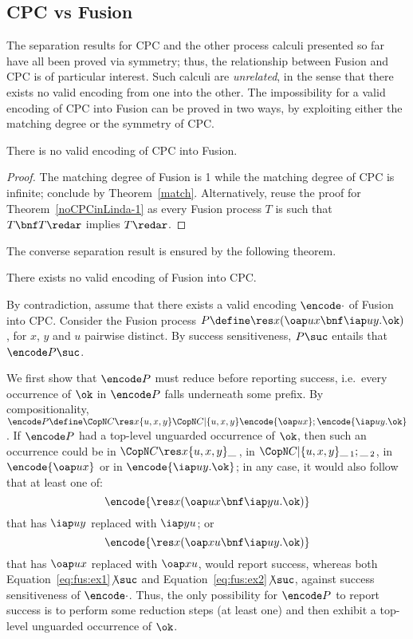 \documentclass{LMCS}
\begin{document}
\subsection{CPC vs Fusion}

The separation results for CPC and the other process calculi presented so far have all been proved via symmetry;
thus, the relationship between Fusion and CPC is of particular interest.
Such calculi are {\em unrelated}, in the sense that there exists no valid
encoding from one into the other. The impossibility for a valid
encoding of CPC into Fusion can be proved in two ways, by exploiting either the matching degree or the symmetry of CPC.

\begin{thm}
\label{thm:nocpc2fusion-1}
There is no valid encoding of CPC into Fusion.
\end{thm}
\begin{proof}
The matching degree of Fusion is 1 while the matching degree of CPC is infinite;
conclude by Theorem~\ref{match}.
Alternatively, reuse the proof for Theorem~\ref{noCPCinLinda-1} as every Fusion process 
$T$ is such that $T\bnf T\redar$ implies $T\redar$.
\end{proof}

The converse separation result is ensured by the following theorem.

\begin{thm}
\label{thm:fusionNoinCPC}
There exists no valid encoding of Fusion into CPC.
\end{thm}
\proof
By contradiction, assume that there exists a valid encoding $\encode\cdot$
of Fusion into CPC.
Consider the Fusion process $P \define \res x(\oap u x\bnf \iap u y.\ok)$,
for $x$, $y$ and $u$ pairwise distinct. By success sensitiveness, $P \suc$
entails that $\encode P \suc$. 

We first show that $\encode P$ must reduce before reporting success,
i.e.\ every occurrence of $\ok$ in $\encode P$ falls underneath
some prefix.  By compositionality, $\encode P \define \CopN C {\res x}
{\{u,x,y\}} {\CopN C | {\{u,x,y\}} {\encode{\oap u x};\\ \encode{\iap u
      y.\ok}}}$.  If $\encode P$ had a top-level unguarded occurrence
of $\ok$, then such an occurrence could be in $\CopN C {\res x}
{\{u,x,y\}} {\_\,}$, in $\CopN C | {\{u,x,y\}} {\_\,_1;\_\,_2}$, in
$\encode{\oap u x}$ or in $\encode{\iap u y.\ok}$; in any case, it
would also follow that at least one of:
\begin{equation}
\label{eq:fus:ex1}
\encode{\res x(\oap u x\bnf \iap y u.\ok)}
\end{equation}
that has $\iap u y$ replaced with $\iap y u$;
or
\begin{equation}
\label{eq:fus:ex2}
\encode{\res x(\oap x u\bnf \iap u y.\ok)}
\end{equation}
that has $\oap u x$ replaced with $\oap x u$,
would report success, 
whereas both
Equation~\ref{eq:fus:ex1}$\not\suc$
and
Equation~\ref{eq:fus:ex2}$\not\suc$,
against success sensitiveness of $\encode\cdot$.
Thus, the only possibility for $\encode P$ to report success is
to perform some reduction steps (at least one) and then exhibit
a top-level unguarded occurrence of $\ok$.
\end{document}
